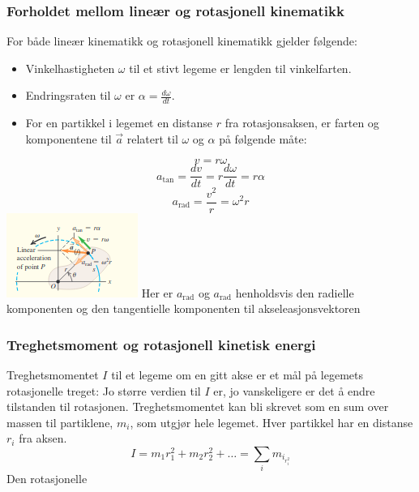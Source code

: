 \subsubsection{Forholdet mellom lineær og rotasjonell kinematikk}
For både lineær kinematikk og rotasjonell kinematikk gjelder følgende:\newline\newline
\begin{itemize}
    \item Vinkelhastigheten $\omega$ til et stivt legeme er lengden til vinkelfarten.
    \item Endringsraten til $\omega$ er $\alpha=\frac{d\omega}{dt}.$
    \item For en partikkel i legemet en distanse $r$ fra rotasjonsaksen, er farten og komponentene til $\vec{a}$ relatert til $\omega$ og $\alpha$ på følgende måte:
\end{itemize}
\begin{equation}
    v=r\omega
\end{equation}
\begin{equation}
    a_{\text{tan}}=\frac{dv}{dt}=r\frac{d\omega}{dt}=r\alpha
\end{equation}
\begin{equation}
    a_{\text{rad}}=\frac{v^2}{r}=\omega^2r
\end{equation}
\includegraphics{rapport/metode/bilder/tang.png}\newline
Her er $a_\text{rad}$ og $a_\text{rad}$ henholdsvis den radielle komponenten og den tangentielle komponenten til akseleasjonsvektoren \cite{FYSIKK:1}

\subsubsection{Treghetsmoment og rotasjonell kinetisk energi}
Treghetsmomentet $I$ til et legeme om en gitt akse er et mål på legemets rotasjonelle treget: Jo større verdien til $I$ er, jo vanskeligere er det å endre tilstanden til rotasjonen. Treghetsmomentet kan bli skrevet som en sum over massen til partiklene, $m_i$, som utgjør hele legemet. Hver partikkel har en distanse $r_i$ fra aksen.
\begin{equation}
    I=m_1r_1^2+m_2r_2^2+\dots=\sum_i{m_i_r_i^2}
\end{equation}
Den rotasjonelle 
